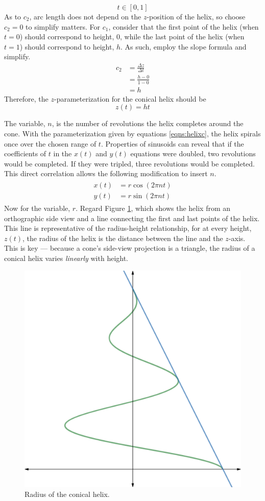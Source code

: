 \documentclass{article}
\begin{document}
\begin{equation}\label{eqn:int}
    t\in[0,1]
\end{equation}
As to $c_2$, arc length does not depend on the $z$-position of the helix, so choose $c_2=0$ to simplify matters. For $c_1$, consider that the first point of the helix (when $t=0$) should correspond to height, $0$, while the last point of the helix (when $t=1$) should correspond to height, $h$. As such, employ the slope formula and simplify.
\begin{align*}
    c_2 &= \frac{\Delta z}{\Delta t}\\
    &= \frac{h-0}{1-0}\\
    &= h
\end{align*}
Therefore, the $z$-parameterization for the conical helix should be
\begin{equation}\label{eqn:z}
    z(t)=ht
\end{equation}\par
The variable, $n$, is the number of revolutions the helix completes around the cone. With the parameterization given by equations \ref{eqns:helixc}, the helix spirals once over the chosen range of $t$. Properties of sinusoids can reveal that if the coefficients of $t$ in the $x(t)$ and $y(t)$ equations were doubled, two revolutions would be completed. If they were tripled, three revolutions would be completed. This direct correlation allows the following modification to insert $n$.
\begin{align}\label{eqns:xy}
    \begin{split}
        x(t) &= r\cos(2\pi nt)\\
        y(t) &= r\sin(2\pi nt)
    \end{split}
\end{align}
Now for the variable, $r$. Regard Figure \ref{fig:coneside}, which shows the helix from an orthographic side view and a line connecting the first and last points of the helix. This line is representative of the radius-height relationship, for at every height, $z(t)$, the radius of the helix is the distance between the line and the $z$-axis. This is key --- because a cone's side-view projection is a triangle, the radius of a conical helix varies \emph{linearly} with height.

\begin{figure}[h!]
    \centering
    \includegraphics[width=0.4\linewidth]{Blender/ConeSide-f.png}
    \caption{Radius of the conical helix.}
    \label{fig:coneside}
\end{figure}
\end{document}
